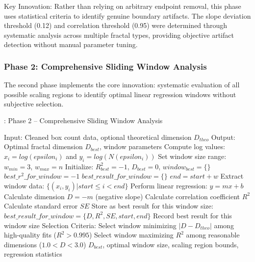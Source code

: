 \documentclass[preprint,12pt]{elsarticle}
\def\textbf#1{#1}%
\def\log{log}%
\def\epsilon{epsilon}%
\begin{document}
\textbf{Key Innovation}: Rather than relying on arbitrary endpoint removal, this phase uses statistical criteria to identify genuine boundary artifacts. The slope deviation threshold (0.12) and correlation threshold (0.95) were determined through systematic analysis across multiple fractal types, providing objective artifact detection without manual parameter tuning.

\subsubsection{Phase 2: Comprehensive Sliding Window Analysis}

The second phase implements the core innovation: systematic evaluation of all possible scaling regions to identify optimal linear regression windows without subjective selection.

\begin{algorithm}[H]
\caption{\textbf{: Phase 2} --  Comprehensive Sliding Window Analysis}
\label{alg:phase2}
\begin{algorithmic}[1]
\small
\State \textbf{Input:} Cleaned box count data, optional theoretical dimension $D_{theo}$
\State \textbf{Output:} Optimal fractal dimension $D_{best}$, window parameters
\State
\State Compute log values: $x_i = \log(\epsilon_i)$ and $y_i = \log(N(\epsilon_i))$
\State Set window size range: $w_{min} = 3$, $w_{max} = n$
\State Initialize: $R^2_{best} = -1$, $D_{best} = 0$, $window_{best} = \{\}$
\State
{}
    \State $best\_r^2\_for\_window = -1$
    \State $best\_result\_for\_window = \{\}$
    \State
        \State $end = start + w$
        \State Extract window data: $\{(x_i, y_i) | start \leq i < end\}$
        \State
        \State Perform linear regression: $y = mx + b$
        \State Calculate dimension $D = -m$ (negative slope)
        \State Calculate correlation coefficient $R^2$
        \State Calculate standard error $SE$
        \State
            \State Store as best result for this window size:
            \State $best\_result\_for\_window = \{D, R^2, SE, start, end\}$
        \EndIf
    \EndFor
    \State
    \State Record best result for this window size
\EndFor
\State
\State \textbf{Selection Criteria:}
    \State Select window minimizing $|D - D_{theo}|$ among high-quality fits ($R^2 > 0.995$)
\Else
    \State Select window maximizing $R^2$ among reasonable dimensions ($1.0 < D < 3.0$)
\EndIf
\State
\State \Return $D_{best}$, optimal window size, scaling region bounds, regression statistics
\end{algorithmic}
\end{algorithm}
\end{document}
